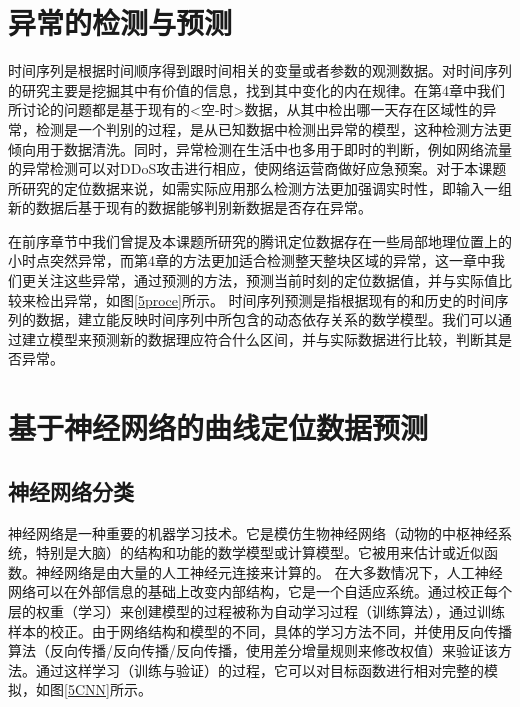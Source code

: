 \documentclass[a4paper,AutoFakeBold,oneside,12pt]{book}
\begin{document}
\section{异常的检测与预测}
	时间序列是根据时间顺序得到跟时间相关的变量或者参数的观测数据\cite{布罗克韦尔2001时间序列的理论与方法}。对时间序列的研究主要是挖掘其中有价值的信息，找到其中变化的内在规律\cite{keogh2004data}。在第4章中我们所讨论的问题都是基于现有的<空-时>数据，从其中检出哪一天存在区域性的异常，检测是一个判别的过程，是从已知数据中检测出异常的模型，这种检测方法更倾向用于数据清洗。同时，异常检测在生活中也多用于即时的判断，例如网络流量的异常检测可以对DDoS攻击进行相应，使网络运营商做好应急预案。对于本课题所研究的定位数据来说，如需实际应用那么检测方法更加强调实时性，即输入一组新的数据后基于现有的数据能够判别新数据是否存在异常。


	在前序章节中我们曾提及本课题所研究的腾讯定位数据存在一些局部地理位置上的小时点突然异常，而第4章的方法更加适合检测整天整块区域的异常，这一章中我们更关注这些异常，通过预测的方法，预测当前时刻的定位数据值，并与实际值比较来检出异常，如图\ref{5proce}所示。
	时间序列预测是指根据现有的和历史的时间序列的数据，建立能反映时间序列中所包含的动态依存关系的数学模型\cite{刘大同2010基于}。我们可以通过建立模型来预测新的数据理应符合什么区间，并与实际数据进行比较，判断其是否异常。


\section{基于神经网络的曲线定位数据预测}
\subsection{神经网络分类}
	神经网络是一种重要的机器学习技术。它是模仿生物神经网络（动物的中枢神经系统，特别是大脑）的结构和功能的数学模型或计算模型。它被用来估计或近似函数。神经网络是由大量的人工神经元连接来计算的。
	在大多数情况下，人工神经网络可以在外部信息的基础上改变内部结构，它是一个自适应系统。通过校正每个层的权重（学习）来创建模型的过程被称为自动学习过程（训练算法），通过训练样本的校正。由于网络结构和模型的不同，具体的学习方法不同，并使用反向传播算法（反向传播/反向传播/反向传播，使用差分增量规则来修改权值）来验证该方法。通过这样学习（训练与验证）的过程，它可以对目标函数进行相对完整的模拟，如图\ref{5CNN}所示。

\end{document}
